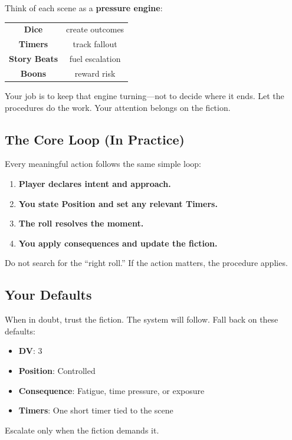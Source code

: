 \begin{tcolorbox}[
  colback=blue!3!white,
  colframe=blue!60!black,
  title={GM Mindset: The Pressure Engine},
  breakable
]
Think of each scene as a \textbf{pressure engine}:

\begin{center}
\begin{tabular}{c c}
\textbf{Dice} & create outcomes \\
\textbf{Timers} & track fallout \\
\textbf{Story Beats} & fuel escalation \\
\textbf{Boons} & reward risk
\end{tabular}
\end{center}

Your job is to keep that engine turning---not to decide where it ends. 
Let the procedures do the work. Your attention belongs on the fiction.
\end{tcolorbox}

\subsection{The Core Loop (In Practice)}
\label{subsec:gm-core-loop}
Every meaningful action follows the same simple loop:
\begin{enumerate}
\item \textbf{Player declares intent and approach.}
\item \textbf{You state Position and set any relevant Timers.}
\item \textbf{The roll resolves the moment.}
\item \textbf{You apply consequences and update the fiction.}
\end{enumerate}
Do not search for the ``right roll.'' If the action matters, the procedure applies.

\subsection{Your Defaults}
\label{subsec:gm-defaults}
When in doubt, trust the fiction. The system will follow. Fall back on these defaults:
\begin{itemize}
\item \textbf{DV}: 3
\item \textbf{Position}: Controlled
\item \textbf{Consequence}: Fatigue, time pressure, or exposure
\item \textbf{Timers}: One short timer tied to the scene
\end{itemize}
Escalate only when the fiction demands it.

